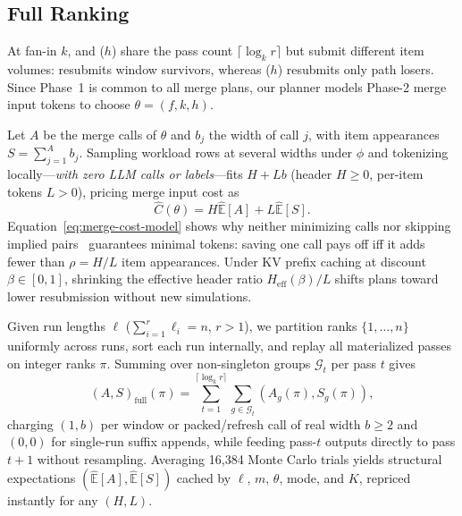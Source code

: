 \subsection{Full Ranking}
\label{sec:cost-full}

At fan-in $k$, \SW{} and \LT($h$) share the pass count $\lceil \log_k r \rceil$ but submit different item volumes: \SW{} resubmits window survivors, whereas \LT($h$) resubmits only path losers. Since Phase~1 is common to all merge plans, our planner models Phase-2 merge input tokens to choose $\theta = (f, k, h)$.

Let $A$ be the merge calls of $\theta$ and $b_j$ the width of call $j$, with item appearances $S = \sum_{j=1}^{A} b_j$. Sampling workload rows at several widths under $\phi$ and tokenizing locally—\emph{with zero LLM calls or labels}—fits $H + L b$ (header $H \ge 0$, per-item tokens $L > 0$), pricing merge input cost as
\begin{equation}
  \widehat C(\theta)=H\widehat{\mathbb E}[A]+L\widehat{\mathbb E}[S].
  \label{eq:merge-cost-model}
\end{equation}
Equation~\eqref{eq:merge-cost-model} shows why neither minimizing calls nor skipping implied pairs~\cite{akinola2026tbs} guarantees minimal tokens: saving one call pays off iff it adds fewer than $\rho = H/L$ item appearances. Under KV prefix caching at discount $\beta \in [0,1]$, shrinking the effective header ratio $H_{\mathrm{eff}}(\beta)/L$ shifts plans toward lower resubmission without new simulations.

Given run lengths $\boldsymbol{\ell}$ ($\sum_{i=1}^r \ell_i = n$, $r > 1$), we partition ranks $\{1,\dots,n\}$ uniformly across runs, sort each run internally, and replay all materialized passes on integer ranks $\pi$. Summing over non-singleton groups $\mathcal{G}_t$ per pass $t$ gives
\begin{equation}
  (A,S)_{\mathrm{full}}(\pi)=
  \sum_{t=1}^{\lceil\log_k r\rceil}
  \sum_{g\in\mathcal G_t}(A_g(\pi),S_g(\pi)),
  \label{eq:total-merge-cost}
\end{equation}
charging $(1,b)$ per \SW{} window or \LT{} packed/refresh call of real width $b \ge 2$ and $(0,0)$ for single-run suffix appends, while feeding pass-$t$ outputs directly to pass $t+1$ without resampling. Averaging 16,384 Monte Carlo trials yields structural expectations $(\widehat{\mathbb E}[A], \widehat{\mathbb E}[S])$ cached by $\boldsymbol{\ell}$, $m$, $\theta$, mode, and $K$, repriced instantly for any $(H,L)$.

